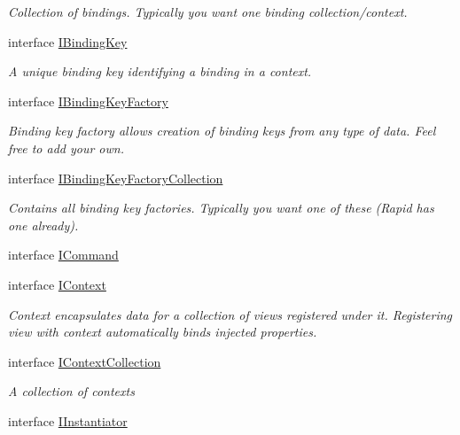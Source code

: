 \begin{DoxyCompactItemize}
\begin{DoxyCompactList}\small\item\em Collection of bindings. Typically you want one binding collection/context. \end{DoxyCompactList}\item 
interface \mbox{\hyperlink{interfacecp_games_1_1core_1_1_rapid_m_v_c_1_1_i_binding_key}{I\+Binding\+Key}}
\begin{DoxyCompactList}\small\item\em A unique binding key identifying a binding in a context. \end{DoxyCompactList}\item 
interface \mbox{\hyperlink{interfacecp_games_1_1core_1_1_rapid_m_v_c_1_1_i_binding_key_factory}{I\+Binding\+Key\+Factory}}
\begin{DoxyCompactList}\small\item\em Binding key factory allows creation of binding keys from any type of data. Feel free to add your own. \end{DoxyCompactList}\item 
interface \mbox{\hyperlink{interfacecp_games_1_1core_1_1_rapid_m_v_c_1_1_i_binding_key_factory_collection}{I\+Binding\+Key\+Factory\+Collection}}
\begin{DoxyCompactList}\small\item\em Contains all binding key factories. Typically you want one of these (Rapid has one already). \end{DoxyCompactList}\item 
interface \mbox{\hyperlink{interfacecp_games_1_1core_1_1_rapid_m_v_c_1_1_i_command}{I\+Command}}
\item 
interface \mbox{\hyperlink{interfacecp_games_1_1core_1_1_rapid_m_v_c_1_1_i_context}{I\+Context}}
\begin{DoxyCompactList}\small\item\em Context encapsulates data for a collection of views registered under it. Registering view with context automatically binds injected properties. \end{DoxyCompactList}\item 
interface \mbox{\hyperlink{interfacecp_games_1_1core_1_1_rapid_m_v_c_1_1_i_context_collection}{I\+Context\+Collection}}
\begin{DoxyCompactList}\small\item\em A collection of contexts \end{DoxyCompactList}\item 
interface \mbox{\hyperlink{interfacecp_games_1_1core_1_1_rapid_m_v_c_1_1_i_instantiator}{I\+Instantiator}}

\end{DoxyCompactItemize}

